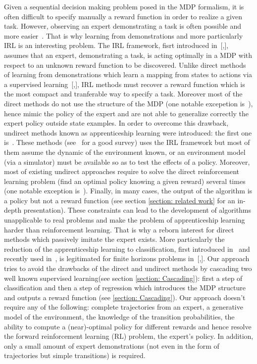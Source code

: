 \documentclass{article} %
\newcommand{\0}{\mathbf{0}}
\newcommand{\1}{\mathbf{1}}
\begin{document}
Given a sequential decision making problem posed in the MDP formalism, it is often difficult to specify manually a reward function in order to realize a given task. However, observing an expert demonstrating a task is often possible and more easier~\cite{ng2000algorithms}. That is why learning from demonstrations and more particularly IRL is an interesting problem. The IRL framework, fisrt introduced in~[\cite{russell1998learning},\cite{ng2000algorithms}], assumes that an expert, demonstrating a task, is acting optimally in a MDP with respect to an unknown reward function to be discovered. Unlike direct methods of learning from demonstrations which learn a mapping from states to actions via a supervised learning~[\cite{atkeson1997robot},\cite{pomerleau1989alvinn}], IRL methods must recover a reward function which is the most compact and tranferable way to specify a task. Moreover most of the direct methods do not use the structure of the MDP (one notable excepetion is~\cite{melo2010learning}), hence mimic the policy of the expert and are not able to generalize correctly the expert policy outside state examples. In order to overcome this drawback, undirect methods known as apprenticeship learning were introduced: the first one is~\cite{ng2004feature}. These methods (see~\cite{neu2009training} for a good survey) uses the IRL framework but most of them assume the dynamic of the environment known, or an environment model (via a simulator) must be available so as to test the effects of a policy. Moreover, most of existing undirect approaches require to solve the direct reinforcement learning problem (find an optimal policy knowing a given reward) several times (one notable exception is~\cite{boularias2011relative}). Finally, in many cases, the output of the algorithm is a policy but not a reward function (see section \ref{section: related work} for an in-depth presentation). These constraints can lead to the development of algorithms unapplicable to real problems and make the problem of apprenticeship learning harder than reinforcement learning. That is why a reborn interest for direct methods which passively imitate the expert exists. More particularly the reduction of the apprenticeship learning to classification, first introduced in~\cite{zadrozny2003cost} and recently used in~\cite{melo2010learning}, is legitimated for finite horizons problems in~[\cite{syed2010reduction},\cite{ross2010efficient}]. Our approach tries to avoid the drawbacks of the direct and undirect methods by cascading two well known supervised learning(see section \ref{section: Cascading}): first a step of classification and then a step of regression which introduces the MDP structure and  outputs a reward function (see \ref{section: Cascading}). Our approach doesn't require any of the following: complete trajectories from an expert, a generative model of the environment, the knowledge of the transition probabilities, the ability to compute a (near)-optimal policy for different rewards and hence resolve the forward reinforcement learning (RL) problem, the expert's policy. In addition, only a small amount of expert demonstrations (not even in the form of trajectories but simple transitions) is required.\\
\end{document}
